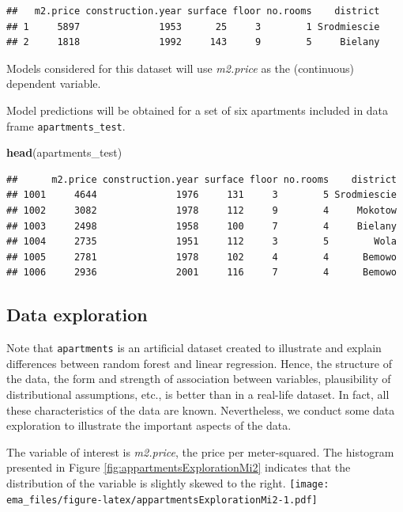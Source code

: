 \documentclass[]{krantz}
\newenvironment{Shaded}{\begin{snugshade}}{\end{snugshade}}
\newcommand{\KeywordTok}[1]{\textcolor[rgb]{0.13,0.29,0.53}{\textbf{#1}}}
\newcommand{\NormalTok}[1]{#1}
\begin{document}
\begin{verbatim}
##   m2.price construction.year surface floor no.rooms    district
## 1     5897              1953      25     3        1 Srodmiescie
## 2     1818              1992     143     9        5     Bielany
\end{verbatim}

Models considered for this dataset will use \emph{m2.price} as the (continuous) dependent variable.

Model predictions will be obtained for a set of six apartments included in data frame \texttt{apartments\_test}.

\begin{Shaded}
\begin{Highlighting}[]
\KeywordTok{head}\NormalTok{(apartments_test)}
\end{Highlighting}
\end{Shaded}

\begin{verbatim}
##      m2.price construction.year surface floor no.rooms    district
## 1001     4644              1976     131     3        5 Srodmiescie
## 1002     3082              1978     112     9        4     Mokotow
## 1003     2498              1958     100     7        4     Bielany
## 1004     2735              1951     112     3        5        Wola
## 1005     2781              1978     102     4        4      Bemowo
## 1006     2936              2001     116     7        4      Bemowo
\end{verbatim}

\hypertarget{exploration-apartments}{%
\subsection{Data exploration}\label{exploration-apartments}}

Note that \texttt{apartments} is an artificial dataset created to illustrate and explain differences between random forest and linear regression. Hence, the structure of the data, the form and strength of association between variables, plausibility of distributional assumptions, etc., is better than in a real-life dataset. In fact, all these characteristics of the data are known. Nevertheless, we conduct some data exploration to illustrate the important aspects of the data.

The variable of interest is \emph{m2.price}, the price per meter-squared. The histogram presented in Figure \ref{fig:appartmentsExplorationMi2} indicates that the distribution of the variable is slightly skewed to the right.
\texttt{[image: ema\_files/figure-latex/appartmentsExplorationMi2-1.pdf]}
\end{document}
